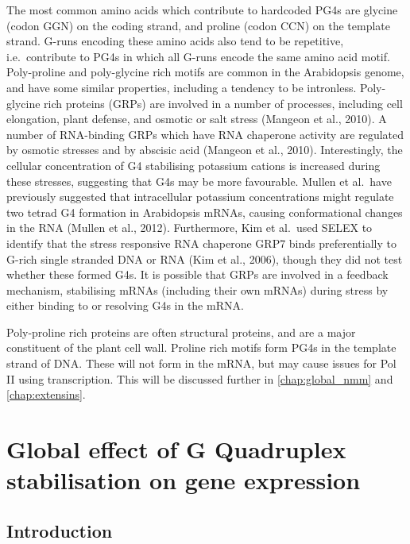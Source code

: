 \documentclass[12pt,a4paper,]{report}
\begin{document}
The most common amino acids which contribute to hardcoded PG4s are
glycine (codon GGN) on the coding strand, and proline (codon CCN) on the
template strand. G-runs encoding these amino acids also tend to be
repetitive, i.e.~contribute to PG4s in which all G-runs encode the same
amino acid motif. Poly-proline and poly-glycine rich motifs are common
in the Arabidopsis genome, and have some similar properties, including a
tendency to be intronless. Poly-glycine rich proteins (GRPs) are
involved in a number of processes, including cell elongation, plant
defense, and osmotic or salt stress (Mangeon et al., 2010). A number of
RNA-binding GRPs which have RNA chaperone activity are regulated by
osmotic stresses and by abscisic acid (Mangeon et al., 2010).
Interestingly, the cellular concentration of G4 stabilising potassium
cations is increased during these stresses, suggesting that G4s may be
more favourable. Mullen et al.~have previously suggested that
intracellular potassium concentrations might regulate two tetrad G4
formation in Arabidopsis mRNAs, causing conformational changes in the
RNA (Mullen et al., 2012). Furthermore, Kim et al.~used SELEX to
identify that the stress responsive RNA chaperone GRP7 binds
preferentially to G-rich single stranded DNA or RNA (Kim et al., 2006),
though they did not test whether these formed G4s. It is possible that
GRPs are involved in a feedback mechanism, stabilising mRNAs (including
their own mRNAs) during stress by either binding to or resolving G4s in
the mRNA.

Poly-proline rich proteins are often structural proteins, and are a
major constituent of the plant cell wall. Proline rich motifs form PG4s
in the template strand of DNA. These will not form in the mRNA, but may
cause issues for Pol II using transcription. This will be discussed
further in \ref{chap:global_nmm} and \ref{chap:extensins}.

\newpage

\hypertarget{global-effect-of-g-quadruplex-stabilisation-on-gene-expression}{%
\chapter{Global effect of G Quadruplex stabilisation on gene
expression}\label{global-effect-of-g-quadruplex-stabilisation-on-gene-expression}}

\label{chap:global_nmm}

\hypertarget{introduction-3}{%
\section{Introduction}\label{introduction-3}}
\end{document}
